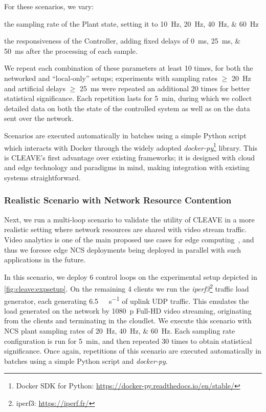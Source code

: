 For these scenarios, we vary:
\begin{enumerate*}[itemjoin={{; }}, itemjoin*={{; and }}]
    \item the sampling rate of the Plant state, setting it to \SIlist[list-final-separator={, or }]{10;20;40;60}{\hertz}
    \item the responsiveness of the Controller, adding fixed delays of \SIlist[list-final-separator={, or }]{0;25;50}{\milli\second} after the processing of each sample.
\end{enumerate*}

We repeat each combination of these parameters at least \num{10} times, for both the networked and ``local-only'' setups; experiments with sampling rates \( \geq \) \SI{20}{\hertz} and artificial delays \( \geq \) \SI{25}{\milli\second} were repeated an additional \num{20} times for better statistical significance.
Each repetition lasts for \SI{5}{\minute}, during which we collect detailed data on both the state of the controlled system as well as on the data sent over the network.

Scenarios are executed automatically in batches using a simple Python script which interacts with Docker through the widely adopted \emph{docker-py}\footnote{Docker SDK for Python: \url{https://docker-py.readthedocs.io/en/stable/}} library.
This is \ac{CLEAVE}'s first advantage over existing frameworks; it is designed with cloud and edge technology and paradigms in mind, making integration with existing systems straightforward.

\subsubsection{Realistic Scenario with Network Resource Contention}

Next, we run a multi-loop scenario to validate the utility of \ac{CLEAVE} in a more realistic setting where network resources are shared with video stream traffic.
Video analytics is one of the main proposed use cases for edge computing~\cite{Ananthanarayanan2017Analytics,Yi2017Analytics,Wang2018Analytics}, and thus we foresee edge \ac{NCS} deployments being deployed in parallel with such applications in the future.

In this scenario, we deploy \num{6} control loops on the experimental setup depicted in \cref{fig:cleave:expsetup}.
On the remaining \num{4} clients we run the \emph{iperf3}\footnote{iperf3: \url{https://iperf.fr/}} traffic load generator, each generating \SI[per-mode=symbol]{6.5}{\mega\bit\per\second} of uplink \ac{UDP} traffic.
This emulates the load generated on the network by \SI{1080}{p} Full-HD video streaming, originating from the clients and terminating in the cloudlet.
We execute this scenario with \ac{NCS} plant sampling rates of \SIlist{20;40;60}{\hertz}.
Each sampling rate configuration is run for \SI{5}{\minute}, and then repeated \num{30} times to obtain statistical significance.
Once again, repetitions of this scenario are executed automatically in batches using a simple Python script and \emph{docker-py}.

